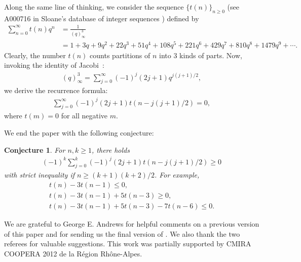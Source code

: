 \documentclass[12pt]{article}
\newtheorem{conj}[thm]{Conjecture}
\theoremstyle{remark}
\numberwithin{equation}{section}
\begin{document}
Along the same line of thinking,  we consider the sequence
$\{t(n)\}_{n\geqslant 0}$ (see  A000716 in Sloane's database of integer sequences
\cite{Sloane}) defined by
\begin{align*}
\sum_{n=0}^{\infty} t(n) q^n
&=\frac{1}{(q)_\infty^3} \\[5pt] %
&=1+3q+9q^2+22q^3+51q^4+108q^5+221q^6+429q^7+810q^8+1479q^9+\cdots.
\end{align*}
Clearly, the number $t(n)$ counts partitions of $n$ into  $3$ kinds of parts. Now, invoking
the identity of Jacobi~\cite[p.~377]{HW}:
\begin{align*}
{(q)_\infty^3}=\sum_{j=0}^\infty (-1)^j (2j+1)q^{j(j+1)/2},
\end{align*}
we derive  the recurrence formula:
\begin{align*}
\sum_{j=0}^\infty (-1)^j(2j+1)t(n-j(j+1)/2)=0,
\end{align*}
where $t(m)=0$ for all negative $m$.

We end the paper with the following conjecture:
\begin{conj}For $n,k\geqslant 1$, there holds
\begin{align*}
(-1)^k\sum_{j=0}^k (-1)^j(2j+1)t(n-j(j+1)/2) \geqslant 0
\end{align*}
with strict inequality if $n\geqslant (k+1)(k+2)/2$. For example,
\begin{align*}
t(n)-3t(n-1)\leqslant 0,  \\
t(n)-3t(n-1)+5t(n-3)\geqslant 0, \\
t(n)-3t(n-1)+5t(n-3)-7t(n-6)\leqslant 0.
\end{align*}
\end{conj}


\vskip 5mm  We are grateful to George E. Andrews for
helpful comments on a previous version of this paper and for sending us the final version of \cite{AM}.
We also thank the two referees for valuable suggestions.
This work was  partially supported by CMIRA COOPERA 2012 de  la R\'egion Rh\^one-Alpes.
\end{document}
